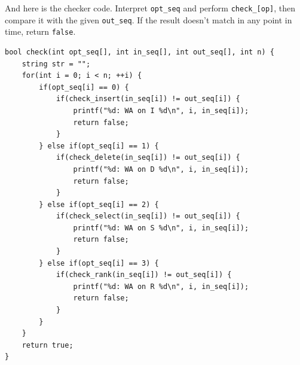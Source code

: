 \documentclass[12pt]{article}
\begin{document}
And here is the checker code. Interpret \texttt{opt\_seq} and perform \texttt{check\_[op]}, then compare it with the given \texttt{out\_seq}. If the result doesn't match in any point in time, return \texttt{false}.
\begin{lstlisting}[style=Cstyle]
bool check(int opt_seq[], int in_seq[], int out_seq[], int n) {
	string str = "";
	for(int i = 0; i < n; ++i) {
		if(opt_seq[i] == 0) {
			if(check_insert(in_seq[i]) != out_seq[i]) {
				printf("%d: WA on I %d\n", i, in_seq[i]);
				return false;
			}
		} else if(opt_seq[i] == 1) {
			if(check_delete(in_seq[i]) != out_seq[i]) {
				printf("%d: WA on D %d\n", i, in_seq[i]);
				return false;
			}
		} else if(opt_seq[i] == 2) {
			if(check_select(in_seq[i]) != out_seq[i]) {
				printf("%d: WA on S %d\n", i, in_seq[i]);
				return false;
			}
		} else if(opt_seq[i] == 3) {
			if(check_rank(in_seq[i]) != out_seq[i]) {
				printf("%d: WA on R %d\n", i, in_seq[i]);
				return false;
			}
		}
	}
	return true;
}
\end{lstlisting}
\end{document}
